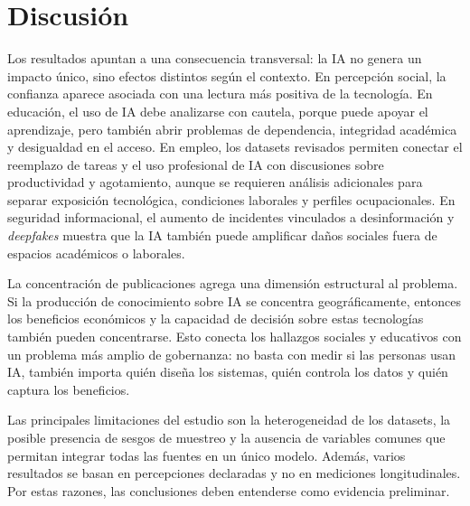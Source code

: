 \documentclass{llncs}
\begin{document}
\section{Discusión}
Los resultados apuntan a una consecuencia transversal: la IA no genera un impacto único, sino efectos distintos según el contexto. En percepción social, la confianza aparece asociada con una lectura más positiva de la tecnología. En educación, el uso de IA debe analizarse con cautela, porque puede apoyar el aprendizaje, pero también abrir problemas de dependencia, integridad académica y desigualdad en el acceso. En empleo, los datasets revisados permiten conectar el reemplazo de tareas y el uso profesional de IA con discusiones sobre productividad y agotamiento, aunque se requieren análisis adicionales para separar exposición tecnológica, condiciones laborales y perfiles ocupacionales. En seguridad informacional, el aumento de incidentes vinculados a desinformación y \emph{deepfakes} muestra que la IA también puede amplificar daños sociales fuera de espacios académicos o laborales.

La concentración de publicaciones agrega una dimensión estructural al problema. Si la producción de conocimiento sobre IA se concentra geográficamente, entonces los beneficios económicos y la capacidad de decisión sobre estas tecnologías también pueden concentrarse. Esto conecta los hallazgos sociales y educativos con un problema más amplio de gobernanza: no basta con medir si las personas usan IA, también importa quién diseña los sistemas, quién controla los datos y quién captura los beneficios.

Las principales limitaciones del estudio son la heterogeneidad de los datasets, la posible presencia de sesgos de muestreo y la ausencia de variables comunes que permitan integrar todas las fuentes en un único modelo. Además, varios resultados se basan en percepciones declaradas y no en mediciones longitudinales. Por estas razones, las conclusiones deben entenderse como evidencia preliminar.
\end{document}
